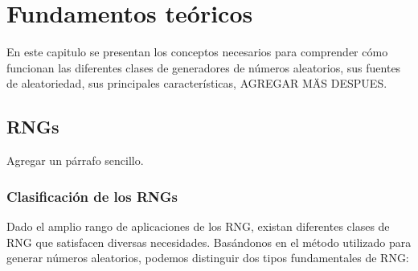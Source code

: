\chapter{Fundamentos teóricos}

    En este capitulo se presentan los conceptos necesarios para comprender cómo funcionan las diferentes clases de generadores de números aleatorios, sus fuentes de aleatoriedad, sus principales características, AGREGAR MÄS DESPUES. 

    \section{RNGs}
        Agregar un párrafo sencillo.

        \subsection{Clasificación de los RNGs}
	        Dado el amplio rango de aplicaciones de los RNG, existan diferentes clases de RNG que satisfacen diversas necesidades. Basándonos en el método utilizado para generar números aleatorios, podemos distinguir dos tipos fundamentales de RNG:
	        
